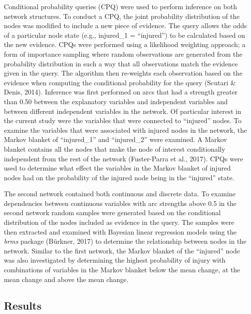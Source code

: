 \documentclass[
  english,
  man,floatsintext]{apa6}
\begin{document}
Conditional probability queries (CPQ) were used to perform inference on both network structures.
To conduct a CPQ, the joint probability distribution of the nodes was modified to include a new piece of evidence.
The query allows the odds of a particular node state (e.g., injured\_1 = \enquote{injured}) to be calculated based on the new evidence.
CPQs were performed using a likelihood weighting approach; a form of importance sampling where random observations are generated from the probability distribution in such a way that all observations match the evidence given in the query.
The algorithm then re-weights each observation based on the evidence when computing the conditional probability for the query (Scutari \& Denis, 2014).
Inference was first performed on arcs that had a strength greater than 0.50 between the explanatory variables and independent variables and between different independent variables in the network.
Of particular interest in the current study were the variables that were connected to \enquote{injured} nodes.
To examine the variables that were associated with injured nodes in the network, the Markov blanket of \enquote{injured\_1} and \enquote{injured\_2} were examined.
A Markov blanket contains all the nodes that make the node of interest conditionally independent from the rest of the network (Fuster-Parra et al., 2017).
CPQs were used to determine what effect the variables in the Markov blanket of injured nodes had on the probability of the injured node being in the \enquote{injured} state.

The second network contained both continuous and discrete data.
To examine dependencies between continuous variables with arc strengths above 0.5 in the second network random samples were generated based on the conditional distribution of the nodes included as evidence in the query.
The samples were then extracted and examined with Bayesian linear regression models using the \emph{brms} package (Bürkner, 2017) to determine the relationship between nodes in the network.
Similar to the first network, the Markov blanket of the \enquote{injured} node was also investigated by determining the highest probability of injury with combinations of variables in the Markov blanket below the mean change, at the mean change and above the mean change.

\newpage

\hypertarget{results-2}{%
\subsection{Results}\label{results-2}}
\end{document}
